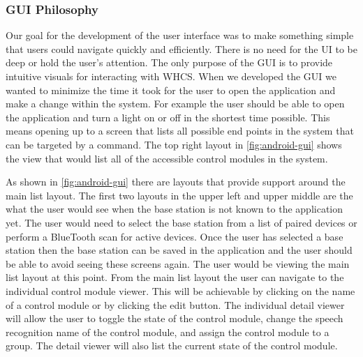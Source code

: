 \subsubsection{GUI Philosophy} Our goal for the development of the user
interface was to make something simple that users could navigate quickly and
efficiently. There is no need for the UI to be deep or hold the user{}'s
attention. The only purpose of the GUI is to provide intuitive visuals for
interacting with WHCS. When we developed the GUI we wanted to minimize the time
it took for the user to open the application and make a change within the
system. For example the user should be able to open the application and turn a
light on or off in the shortest time possible. This means opening up to a
screen that lists all possible end points in the system that can be targeted by
a command. The top right layout in \autoref{fig:android-gui} shows the view
that would list all of the accessible control modules in the system.


As shown in \autoref{fig:android-gui} there are layouts that provide support
around the main list layout. The first two layouts in the upper left and upper
middle are the what the user would see when the base station is not known to
the application yet. The user would need to select the base station from a list
of paired devices or perform a BlueTooth scan for active devices. Once the user
has selected a base station then the base station can be saved in the
application and the user should be able to avoid seeing these screens again.
The user would be viewing the main list layout at this point. From the main
list layout the user can navigate to the individual control module viewer. This
will be achievable by clicking on the name of a control module or by clicking
the edit button. The individual detail viewer will allow the user to toggle the
state of the control module, change the speech recognition name of the control
module, and assign the control module to a group. The detail viewer will also
list the current state of the control module.

